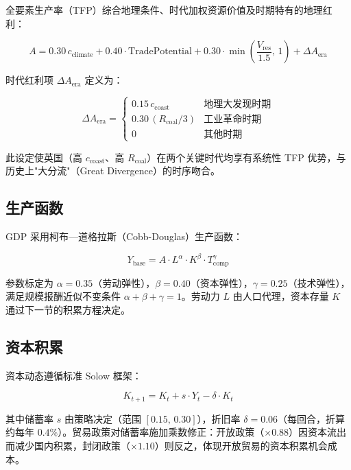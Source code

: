 \documentclass[12pt, a4paper]{article}
\begin{document}
全要素生产率（TFP）综合地理条件、时代加权资源价值及时期特有的地理红利：

\begin{equation}
A = 0.30\,c_{\text{climate}} + 0.40\cdot\text{TradePotential} + 0.30\cdot\min\!\left(\frac{V_{\text{res}}}{1.5},\,1\right) + \Delta A_{\text{era}}
\label{eq:tfp}
\end{equation}

时代红利项 $\Delta A_{\text{era}}$ 定义为：

\begin{equation}
\Delta A_{\text{era}} = \begin{cases}
0.15\,c_{\text{coast}}               & \text{地理大发现时期} \\
0.30\,(R_{\text{coal}}/3)            & \text{工业革命时期} \\
0                                    & \text{其他时期}
\end{cases}
\end{equation}

此设定使英国（高 $c_{\text{coast}}$、高 $R_{\text{coal}}$）在两个关键时代均享有系统性 TFP 优势，与历史上"大分流"（Great Divergence）的时序吻合。

\subsection{生产函数}

GDP 采用柯布—道格拉斯（Cobb-Douglas）生产函数：

\begin{equation}
Y_{\text{base}} = A \cdot L^{\alpha} \cdot K^{\beta} \cdot T_{\text{comp}}^{\gamma}
\label{eq:cobb_douglas}
\end{equation}

参数标定为 $\alpha = 0.35$（劳动弹性），$\beta = 0.40$（资本弹性），$\gamma = 0.25$（技术弹性），满足规模报酬近似不变条件 $\alpha + \beta + \gamma = 1$。劳动力 $L$ 由人口代理，资本存量 $K$ 通过下一节的积累方程决定。

\subsection{资本积累}

资本动态遵循标准 Solow 框架：

\begin{equation}
K_{t+1} = K_t + s \cdot Y_t - \delta \cdot K_t
\label{eq:capital}
\end{equation}

其中储蓄率 $s$ 由策略决定（范围 $[0.15,\, 0.30]$），折旧率 $\delta = 0.06$（每回合，折算约每年 $0.4\%$）。贸易政策对储蓄率施加乘数修正：开放政策（$\times 0.88$）因资本流出而减少国内积累，封闭政策（$\times 1.10$）则反之，体现开放贸易的资本积累机会成本。
\end{document}
